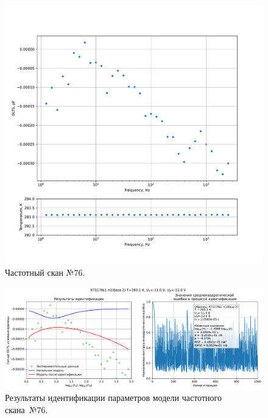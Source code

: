 \begin{figure}[!ht]
    \centering
    \includegraphics[width=1\textwidth]{../plots/КТ117№1_п1(база 2)_2500Гц-1Гц_1пФ_+10С_-11В-12В_20мВ_20мкс_шаг_0,1.pdf}
    \caption{Частотный скан №76.}
    \label{pic:frequency_scan_76}
\end{figure}

\begin{figure}[!ht]
    \centering
    \includegraphics[width=1\textwidth]{../plots/КТ117№1_п1(база 2)_2500Гц-1Гц_1пФ_+10С_-11В-12В_20мВ_20мкс_шаг_0,1_model.pdf}
    \caption{Результаты идентификации параметров модели частотного скана~№76.}
    \label{pic:frequency_scan_model76}
\end{figure}

\pagebreak


